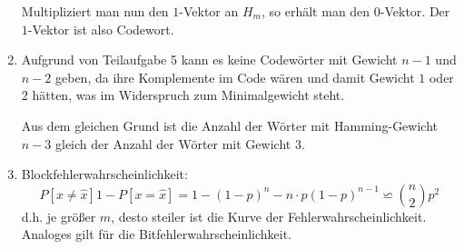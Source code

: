 \begin{enumerate}
	Multipliziert man nun den $1$-Vektor an $H_{m}$, so erhält man den
	$0$-Vektor. Der $1$-Vektor ist also Codewort.
\item
	Aufgrund von Teilaufgabe 5 kann es keine Codewörter mit Gewicht $n - 1$
	und $n - 2$ geben, da ihre Komplemente im Code wären und damit Gewicht
	$1$ oder $2$ hätten, was im Widerspruch zum Minimalgewicht steht.
	
	Aus dem gleichen Grund ist die Anzahl der Wörter mit Hamming-Gewicht $n
	- 3$ gleich der Anzahl der Wörter mit Gewicht $3$.
\item
	Blockfehlerwahrscheinlichkeit:
	\[ P[x\not=\hat x] 1 - P[x=\hat x] = 1 - (1-p)^{n} - n\cdot
	p(1-p)^{n-1}\backsimeq \binom{n}{2}p^2 \]
	d.h. je größer $m$, desto steiler ist die Kurve der
	Fehlerwahrscheinlichkeit. Analoges gilt für die
	Bitfehlerwahrscheinlichkeit.
\end{enumerate}
